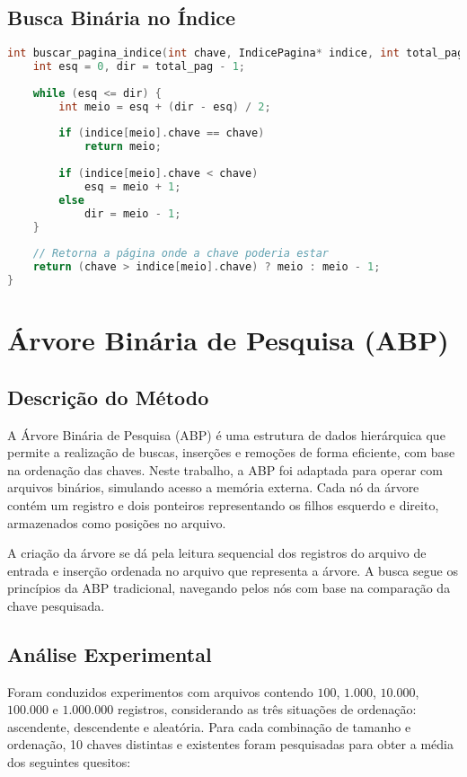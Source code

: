 \documentclass[12pt,a4paper,brazil]{article}
\begin{document}
\subsection*{Busca Binária no Índice}
\begin{lstlisting}[language=C]
int buscar_pagina_indice(int chave, IndicePagina* indice, int total_pag) {
    int esq = 0, dir = total_pag - 1;
    
    while (esq <= dir) {
        int meio = esq + (dir - esq) / 2;
        
        if (indice[meio].chave == chave)
            return meio;
        
        if (indice[meio].chave < chave)
            esq = meio + 1;
        else
            dir = meio - 1;
    }
    
    // Retorna a página onde a chave poderia estar
    return (chave > indice[meio].chave) ? meio : meio - 1;
}
\end{lstlisting}

\section{Árvore Binária de Pesquisa (ABP)}

\subsection{Descrição do Método}

A Árvore Binária de Pesquisa (ABP) é uma estrutura de dados hierárquica que permite a realização de buscas, inserções e remoções de forma eficiente, com base na ordenação das chaves. Neste trabalho, a ABP foi adaptada para operar com arquivos binários, simulando acesso a memória externa. Cada nó da árvore contém um registro e dois ponteiros representando os filhos esquerdo e direito, armazenados como posições no arquivo.

A criação da árvore se dá pela leitura sequencial dos registros do arquivo de entrada e inserção ordenada no arquivo que representa a árvore. A busca segue os princípios da ABP tradicional, navegando pelos nós com base na comparação da chave pesquisada.

\subsection{Análise Experimental}

Foram conduzidos experimentos com arquivos contendo $100$, $1.000$, $10.000$, $100.000$ e $1.000.000$ registros, considerando as três situações de ordenação: ascendente, descendente e aleatória. Para cada combinação de tamanho e ordenação, 10 chaves distintas e existentes foram pesquisadas para obter a média dos seguintes quesitos:
\end{document}
